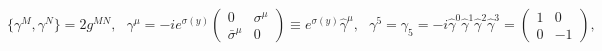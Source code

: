 \begin{equation*}
  \{\gamma^M,\gamma^N\}=2g^{MN},~~~
  \gamma^\mu = -i e^{\sigma(y)} 
    \left( \begin{array}{cc} 
      0 & \sigma^\mu \\ \bar{\sigma}^\mu & 0
    \end{array} \right)
    \equiv e^{\sigma(y)} \hat{\gamma}^\mu,~~~
  \gamma^5 = \gamma_5 = 
    -i\hat{\gamma}^0\hat{\gamma}^1\hat{\gamma}^2\hat{\gamma}^3
    = \left( \begin{array}{cc} 
      1 & 0 \\ 0 & -1
    \end{array} \right),
\end{equation*}


